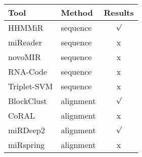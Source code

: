 \documentclass{standalone}
\begin{document}
 \begin{tabular}{l|lc}
 	Tool & Method & Results \\
 	\hline
		HHMMiR  & sequence & \color{Green4}$\surd$\color{black} \\
		miReader  & sequence & \color{Red3}x\color{black} \\
		novoMIR  & sequence & \color{Red3}x\color{black} \\
		RNA-Code  & sequence & \color{Red3}x\color{black} \\
		Triplet-SVM & sequence & \color{Red3}x\color{black} \\
	\hline
		BlockClust & alignment & \color{Green4}$\surd$\color{black} \\
		CoRAL & alignment & \color{Red3}x\color{black} \\
		miRDeep2 & alignment & \color{Green4}$\surd$\color{black} \\
		miRspring & alignment & \color{Red3}x\color{black} \\

 \end{tabular}
\end{document}
